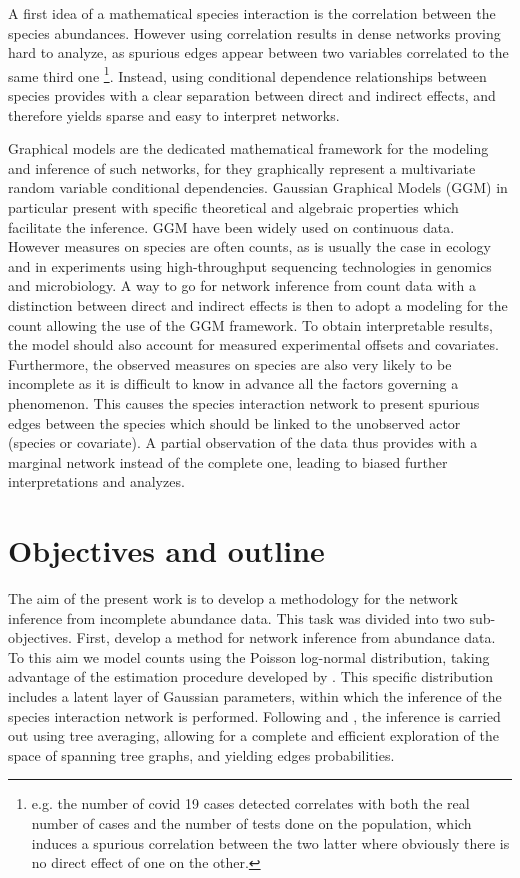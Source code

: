A first idea of a mathematical species interaction is the correlation between the species abundances. However using correlation results in dense networks proving hard to analyze, as spurious edges appear between two variables correlated to the same third one \footnote{e.g. the number of covid 19 cases detected correlates with both the real number of cases and the number of tests done on the population, which induces a spurious correlation between the two latter where obviously there is no direct effect of one on the other.}.  Instead, using conditional dependence relationships between species provides with  a clear separation between direct and indirect effects, and therefore yields sparse and easy to interpret networks.


Graphical models are the dedicated mathematical framework for the modeling and inference of such networks, for they graphically represent a multivariate random variable conditional dependencies. Gaussian Graphical Models (GGM) in particular present with specific theoretical and algebraic properties which facilitate the inference. GGM  have been widely used on continuous data. \\

However measures on species are often counts, as is usually the case in ecology and in experiments using high-throughput sequencing technologies in genomics and microbiology. A way to go for network inference from count data with a distinction between direct and indirect effects is then to adopt a modeling for the count allowing the use of the GGM framework. To obtain interpretable results, the model should also account for measured experimental offsets and covariates. Furthermore, the observed measures on species are also very likely to be incomplete as it is difficult to know in advance all the factors governing a phenomenon. This causes the species interaction network to present spurious edges between the species which should be linked to the unobserved actor (species or covariate). A partial observation of the data thus provides with a marginal network instead of the complete one, leading to biased further interpretations and analyzes.\\


\section*{Objectives and outline} 
The aim of the present work is to develop a methodology for the network inference from incomplete abundance data. This task was divided into two sub-objectives. 
First, develop a method for network inference from abundance data. To this aim we model counts  using the Poisson log-normal distribution, taking advantage of the estimation procedure developed by \citet{CMR18}. This specific distribution includes a latent layer of Gaussian parameters, within which the inference of the species interaction network is performed. Following \citet{MeilaJaak} and \citet{SR17}, the inference is carried out using tree averaging, allowing for a complete and efficient exploration of the space of spanning tree graphs, and yielding edges probabilities.

